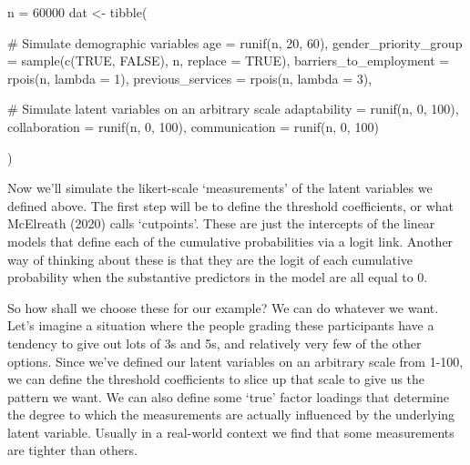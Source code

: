 \documentclass[
  letterpaper,
  DIV=11,
  numbers=noendperiod]{scrreprt}
\newenvironment{Shaded}{\begin{snugshade}}{\end{snugshade}}
\newcommand{\AttributeTok}[1]{\textcolor[rgb]{0.40,0.45,0.13}{#1}}
\newcommand{\CommentTok}[1]{\textcolor[rgb]{0.37,0.37,0.37}{#1}}
\newcommand{\ConstantTok}[1]{\textcolor[rgb]{0.56,0.35,0.01}{#1}}
\newcommand{\DecValTok}[1]{\textcolor[rgb]{0.68,0.00,0.00}{#1}}
\newcommand{\FunctionTok}[1]{\textcolor[rgb]{0.28,0.35,0.67}{#1}}
\newcommand{\NormalTok}[1]{\textcolor[rgb]{0.00,0.23,0.31}{#1}}
\newcommand{\OtherTok}[1]{\textcolor[rgb]{0.00,0.23,0.31}{#1}}
\begin{document}
\begin{Shaded}
\begin{Highlighting}[]
\NormalTok{n }\OtherTok{=} \DecValTok{60000}
\NormalTok{dat }\OtherTok{\textless{}{-}} \FunctionTok{tibble}\NormalTok{(}

        \CommentTok{\# Simulate demographic variables}
        \AttributeTok{age =} \FunctionTok{runif}\NormalTok{(n, }\DecValTok{20}\NormalTok{, }\DecValTok{60}\NormalTok{),}
        \AttributeTok{gender\_priority\_group =} \FunctionTok{sample}\NormalTok{(}\FunctionTok{c}\NormalTok{(}\ConstantTok{TRUE}\NormalTok{, }\ConstantTok{FALSE}\NormalTok{), n, }\AttributeTok{replace =} \ConstantTok{TRUE}\NormalTok{),}
        \AttributeTok{barriers\_to\_employment =} \FunctionTok{rpois}\NormalTok{(n, }\AttributeTok{lambda =} \DecValTok{1}\NormalTok{),}
        \AttributeTok{previous\_services =} \FunctionTok{rpois}\NormalTok{(n, }\AttributeTok{lambda =} \DecValTok{3}\NormalTok{), }

        \CommentTok{\# Simulate latent variables on an arbitrary scale}
        \AttributeTok{adaptability =} \FunctionTok{runif}\NormalTok{(n, }\DecValTok{0}\NormalTok{, }\DecValTok{100}\NormalTok{),}
        \AttributeTok{collaboration =} \FunctionTok{runif}\NormalTok{(n, }\DecValTok{0}\NormalTok{, }\DecValTok{100}\NormalTok{),}
        \AttributeTok{communication =} \FunctionTok{runif}\NormalTok{(n, }\DecValTok{0}\NormalTok{, }\DecValTok{100}\NormalTok{)}

\NormalTok{)}
\end{Highlighting}
\end{Shaded}

Now we'll simulate the likert-scale `measurements' of the latent
variables we defined above. The first step will be to define the
threshold coefficients, or what McElreath (2020) calls `cutpoints'.
These are just the intercepts of the linear models that define each of
the cumulative probabilities via a logit link. Another way of thinking
about these is that they are the logit of each cumulative probability
when the substantive predictors in the model are all equal to 0.

So how shall we choose these for our example? We can do whatever we
want. Let's imagine a situation where the people grading these
participants have a tendency to give out lots of 3s and 5s, and
relatively very few of the other options. Since we've defined our latent
variables on an arbitrary scale from 1-100, we can define the threshold
coefficients to slice up that scale to give us the pattern we want. We
can also define some `true' factor loadings that determine the degree to
which the measurements are actually influenced by the underlying latent
variable. Usually in a real-world context we find that some measurements
are tighter than others.
\end{document}

